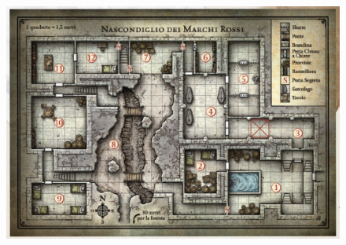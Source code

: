 \documentclass{article}
\begin{document}
\begin{figure}[ht]
        \includegraphics[width=20cm,height=12cm]{../Mappe/NascondiglioDeiMarchiRossi.PNG}
\end{figure}
\end{document}
